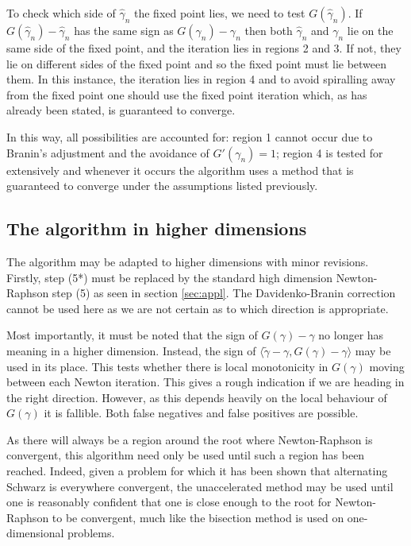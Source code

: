 \documentclass{article}
\begin{document}
To check which side of $\hat{\gamma}_n$ the fixed point lies, we need to test $G(\hat{\gamma}_n)$.
If $G(\hat{\gamma}_n) - \hat{\gamma}_n$ has the same sign as $G(\gamma_n) - \gamma_n$ then both $\hat{\gamma}_n$ and $\gamma_n$ lie on the same side of the fixed point, and the iteration lies in regions 2 and 3.
If not, they lie on different sides of the fixed point and so the fixed point must lie between them.
In this instance, the iteration lies in region 4 and to avoid spiralling away from the fixed point one should use the fixed point iteration which, as has already been stated, is guaranteed to converge.

In this way, all possibilities are accounted for: region 1 cannot occur due to Branin's adjustment and the avoidance of $G'(\gamma_n) = 1$; region 4 is tested for extensively and whenever it occurs the algorithm uses a method that is guaranteed to converge under the assumptions listed previously.

\subsection{The algorithm in higher dimensions}

The algorithm may be adapted to higher dimensions with minor revisions.
Firstly, step (5*) must be replaced by the standard high dimension Newton-Raphson step (5) as seen in section \ref{sec:appl}.
The Davidenko-Branin correction cannot be used here as we are not certain as to which direction is appropriate.

Most importantly, it must be noted that the sign of $G(\gamma)-\gamma$ no longer has meaning in a higher dimension.
Instead, the sign of $\langle \tilde{\gamma}-\gamma, G(\gamma)-\gamma \rangle$ may be used in its place.
This tests whether there is local monotonicity in $G(\gamma)$ moving between each Newton iteration.
This gives a rough indication if we are heading in the right direction.
However, as this depends heavily on the local behaviour of $G(\gamma)$ it is fallible.
Both false negatives and false positives are possible.

As there will always be a region around the root where Newton-Raphson is convergent, this algorithm need only be used until such a region has been reached.
Indeed, given a problem for which it has been shown that alternating Schwarz is everywhere convergent, the unaccelerated method may be used until one is reasonably confident that one is close enough to the root for Newton-Raphson to be convergent, much like the bisection method is used on one-dimensional problems.
\end{document}
